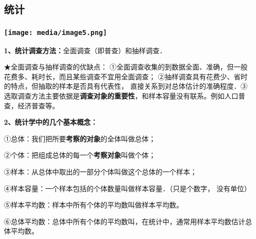 \documentclass[a4paper,11pt,UTF8]{ctexart}
\begin{document}
\hypertarget{ux7edfux8ba1}{%
\subsection{\texorpdfstring{ 统计}{ 统计}}\label{ux7edfux8ba1}}

\hypertarget{ux5b66ux79d1ux7f51www.zxxk.com--ux6559ux80b2ux8d44ux6e90ux95e8ux6237ux63d0ux4f9bux8bd5ux9898ux8bd5ux5377ux6559ux6848ux8bfeux4ef6ux6559ux5b66ux8bbaux6587ux7d20ux6750ux7b49ux5404ux7c7bux6559ux5b66ux8d44ux6e90ux5e93ux4e0bux8f7dux8fd8ux6709ux5927ux91cfux4e30ux5bccux7684ux6559ux5b66ux8d44ux8baf-42}{%
\subsubsection{\texorpdfstring{\protect\texttt{[image: media/image5.png]}}{学科网(www.zxxk.com)-\/-教育资源门户，提供试题试卷、教案、课件、教学论文、素材等各类教学资源库下载，还有大量丰富的教学资讯！}}\label{ux5b66ux79d1ux7f51www.zxxk.com--ux6559ux80b2ux8d44ux6e90ux95e8ux6237ux63d0ux4f9bux8bd5ux9898ux8bd5ux5377ux6559ux6848ux8bfeux4ef6ux6559ux5b66ux8bbaux6587ux7d20ux6750ux7b49ux5404ux7c7bux6559ux5b66ux8d44ux6e90ux5e93ux4e0bux8f7dux8fd8ux6709ux5927ux91cfux4e30ux5bccux7684ux6559ux5b66ux8d44ux8baf-42}}

\textbf{1、统计调查方法：}全面调查（即普查）和抽样调查．

★全面调查与抽样调查的优缺点：
①全面调查收集的到数据全面、准确，但一般花费多、耗时长，而且某些调查不宜用全面调查；
②抽样调查具有花费少、省时的特点，但抽取的样本是否具有代表性，
直接关系到对总体估计的准确程度．③选取调查方法主要依据是\textbf{调查对象的重要性}，和样本容量没有联系。例如人口普查，经济普查等。

\textbf{2、统计学中的几个基本概念：}

①总体：我们把所要\textbf{考察的对象}的全体叫做总体；

②个体：把组成总体的每一个\textbf{考察对象}叫做个体；

③样本：从总体中取出的一部分个体叫做这个总体的一个样本；

④样本容量：一个样本包括的个体数量叫做样本容量．（只是个数字， 没有单位）

⑤样本平均数：样本中所有个体的平均数叫做样本平均数。

⑥总体平均数：总体中所有个体的平均数叫，在统计中，通常用样本平均数估计总体平均数。
\end{document}
